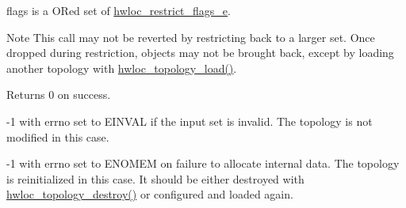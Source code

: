 {\ttfamily flags} is a OR\textquotesingle{}ed set of \hyperlink{a00194_ga9d80f08eb25b7ac22f1b998dc8bf521f}{hwloc\+\_\+restrict\+\_\+flags\+\_\+e}.

\begin{DoxyNote}{Note}
This call may not be reverted by restricting back to a larger set. Once dropped during restriction, objects may not be brought back, except by loading another topology with \hyperlink{a00186_gabdf58d87ad77f6615fccdfe0535ff826}{hwloc\+\_\+topology\+\_\+load()}.
\end{DoxyNote}
\begin{DoxyReturn}{Returns}
0 on success.

-\/1 with errno set to E\+I\+N\+V\+AL if the input set is invalid. The topology is not modified in this case.

-\/1 with errno set to E\+N\+O\+M\+EM on failure to allocate internal data. The topology is reinitialized in this case. It should be either destroyed with \hyperlink{a00186_ga9f34a640b6fd28d23699d4d084667b15}{hwloc\+\_\+topology\+\_\+destroy()} or configured and loaded again. 
\end{DoxyReturn}
